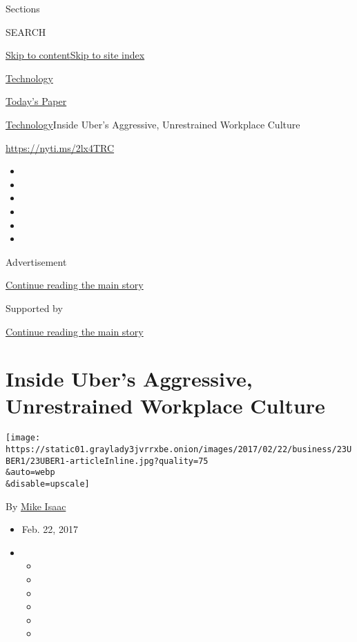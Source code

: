 Sections

SEARCH

\protect\hyperlink{site-content}{Skip to
content}\protect\hyperlink{site-index}{Skip to site index}

\href{https://www.nytimes3xbfgragh.onion/section/technology}{Technology}

\href{https://myaccount.nytimes3xbfgragh.onion/auth/login?response_type=cookie\&client_id=vi}{}

\href{https://www.nytimes3xbfgragh.onion/section/todayspaper}{Today's
Paper}

\href{/section/technology}{Technology}\textbar{}Inside Uber's
Aggressive, Unrestrained Workplace Culture

\url{https://nyti.ms/2lx4TRC}

\begin{itemize}
\item
\item
\item
\item
\item
\item
\end{itemize}

Advertisement

\protect\hyperlink{after-top}{Continue reading the main story}

Supported by

\protect\hyperlink{after-sponsor}{Continue reading the main story}

\hypertarget{inside-ubers-aggressive-unrestrained-workplace-culture}{%
\section{Inside Uber's Aggressive, Unrestrained Workplace
Culture}\label{inside-ubers-aggressive-unrestrained-workplace-culture}}

\texttt{[image: https://static01.graylady3jvrrxbe.onion/images/2017/02/22/business/23UBER1/23UBER1-articleInline.jpg?quality=75\\\&auto=webp\\\&disable=upscale]}

By \href{http://www.nytimes3xbfgragh.onion/by/mike-isaac}{Mike Isaac}

\begin{itemize}
\item
  Feb. 22, 2017
\item
  \begin{itemize}
  \item
  \item
  \item
  \item
  \item
  \item
  \end{itemize}
\end{itemize}

